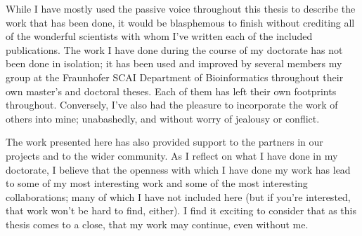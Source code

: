 While I have mostly used the passive voice throughout this thesis to describe the work that has been done, it would be blasphemous to finish without crediting all of the wonderful scientists with whom I've written each of the included publications.
The work I have done during the course of my doctorate has not been done in isolation; it has been used and improved by several members my group at the Fraunhofer SCAI Department of Bioinformatics throughout their own master's and doctoral theses.
Each of them has left their own footprints throughout.
Conversely, I've also had the pleasure to incorporate the work of others into mine; unabashedly, and without worry of jealousy or conflict.

The work presented here has also provided support to the partners in our projects and to the wider community.
As I reflect on what I have done in my doctorate, I believe that the openness with which I have done my work has lead to some of my most interesting work and some of the most interesting collaborations; many of which I have not included here (but if you're interested, that work won't be hard to find, either).
I find it exciting to consider that as this thesis comes to a close, that my work may continue, even without me.
